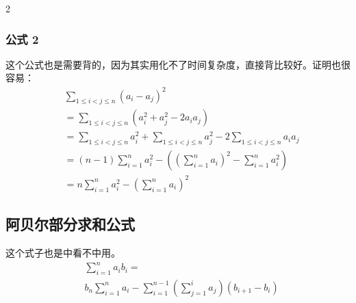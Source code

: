\documentclass[8pt,a4paper]{article}
\begin{document}
\begin{multicols}{2}
    \subsubsection{公式 2}
    这个公式也是需要背的，因为其实用化不了时间复杂度，直接背比较好。证明也很容易：
    \begin{align*}
        &\sum_{1 \le i < j \le n} (a_i - a_j)^2 \\
        &= \sum_{1 \le i < j \le n} (a_i^2 + a_j^2 - 2a_i a_j) \\
        &= \sum_{1 \le i < j \le n} a_i^2 + \sum_{1 \le i < j \le n} a_j^2 - 2\sum_{1 \le i < j \le n} a_i a_j \\
        &= (n-1)\sum_{i=1}^{n} a_i^2 - \left(\left(\sum_{i=1}^{n} a_i\right)^2 - \sum_{i=1}^{n} a_i^2\right) \\
        &= n \sum_{i=1}^{n} a_i^2 - \left(\sum_{i=1}^{n} a_i\right)^2
    \end{align*}

    \subsection{阿贝尔部分求和公式}
    这个式子也是中看不中用。
    \begin{align*}
        &\sum_{i=1}^{n} a_i b_i = \\
        &b_n \sum_{i=1}^{n} a_i - \sum_{i=1}^{n-1} \left(\sum_{j=1}^{i} a_j\right) (b_{i+1} - b_i)
    \end{align*}

\end{multicols}
\end{document}
